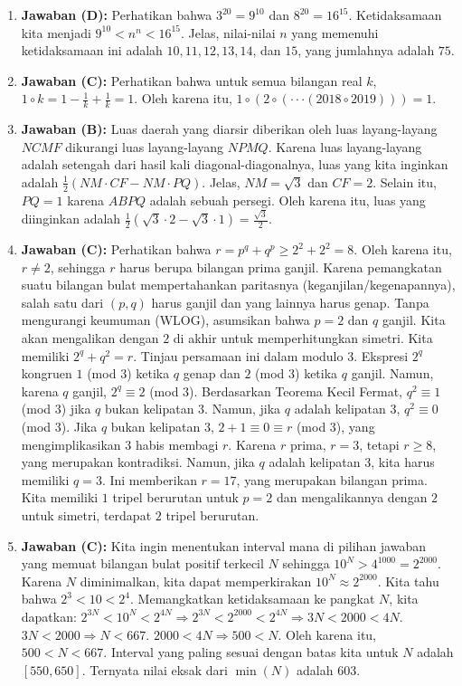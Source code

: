 \documentclass[12pt]{scrartcl}
\begin{document}
\begin{enumerate}
\item \textbf{Jawaban (D):} Perhatikan bahwa $3^{20}=9^{10}$ dan $8^{20}=16^{15}$. Ketidaksamaan kita menjadi $9^{10}<n^{n}<16^{15}$. Jelas, nilai-nilai $n$ yang memenuhi ketidaksamaan ini adalah $10, 11, 12, 13, 14$, dan $15$, yang jumlahnya adalah $75$.

\item \textbf{Jawaban (C):} Perhatikan bahwa untuk semua bilangan real $k$, $1\circ k=1-\frac{1}{k}+\frac{1}{k}=1$. Oleh karena itu, $1\circ(2\circ(\cdot\cdot\cdot(2018\circ2019)))=1$.

\item \textbf{Jawaban (B):} Luas daerah yang diarsir diberikan oleh luas layang-layang $NCMF$ dikurangi luas layang-layang $NPMQ$. Karena luas layang-layang adalah setengah dari hasil kali diagonal-diagonalnya, luas yang kita inginkan adalah $\frac{1}{2}(NM\cdot CF-NM\cdot PQ)$. Jelas, $NM=\sqrt{3}$ dan $CF=2$. Selain itu, $PQ=1$ karena $ABPQ$ adalah sebuah persegi. Oleh karena itu, luas yang diinginkan adalah $\frac{1}{2}(\sqrt{3}\cdot2-\sqrt{3}\cdot1)=\frac{\sqrt{3}}{2}$.

\item \textbf{Jawaban (C):} Perhatikan bahwa $r=p^{q}+q^{p}\ge2^{2}+2^{2}=8$. Oleh karena itu, $r\ne2$, sehingga $r$ harus berupa bilangan prima ganjil. Karena pemangkatan suatu bilangan bulat mempertahankan paritasnya (keganjilan/kegenapannya), salah satu dari $(p, q)$ harus ganjil dan yang lainnya harus genap. Tanpa mengurangi keumuman (WLOG), asumsikan bahwa $p=2$ dan $q$ ganjil. Kita akan mengalikan dengan $2$ di akhir untuk memperhitungkan simetri. Kita memiliki $2^{q}+q^{2}=r$. Tinjau persamaan ini dalam modulo $3$. Ekspresi $2^{q}$ kongruen $1$ (mod $3$) ketika $q$ genap dan $2$ (mod $3$) ketika $q$ ganjil. Namun, karena $q$ ganjil, $2^{q}\equiv2$ (mod $3$). Berdasarkan Teorema Kecil Fermat, $q^{2}\equiv1$ (mod $3$) jika $q$ bukan kelipatan $3$. Namun, jika $q$ adalah kelipatan $3$, $q^{2}\equiv0$ (mod $3$). Jika $q$ bukan kelipatan $3$, $2+1\equiv0\equiv r$ (mod $3$), yang mengimplikasikan $3$ habis membagi $r$. Karena $r$ prima, $r=3$, tetapi $r\ge8$, yang merupakan kontradiksi. Namun, jika $q$ adalah kelipatan $3$, kita harus memiliki $q=3$. Ini memberikan $r=17$, yang merupakan bilangan prima. Kita memiliki $1$ tripel berurutan untuk $p=2$ dan mengalikannya dengan $2$ untuk simetri, terdapat $2$ tripel berurutan.

\item \textbf{Jawaban (C):} Kita ingin menentukan interval mana di pilihan jawaban yang memuat bilangan bulat positif terkecil $N$ sehingga $10^{N}>4^{1000}=2^{2000}$. Karena $N$ diminimalkan, kita dapat memperkirakan $10^{N}\approx2^{2000}$. Kita tahu bahwa $2^{3}<10<2^{4}$. Memangkatkan ketidaksamaan ke pangkat $N$, kita dapatkan: $2^{3N}<10^{N}<2^{4N}\Rightarrow2^{3N}<2^{2000}<2^{4N}\Rightarrow3N<2000<4N$. $3N<2000\Rightarrow N<667$. $2000<4N\Rightarrow500<N$. Oleh karena itu, $500<N<667$. Interval yang paling sesuai dengan batas kita untuk $N$ adalah $[550,650]$. Ternyata nilai eksak dari $\min(N)$ adalah $603$.


\end{enumerate}
\end{document}
